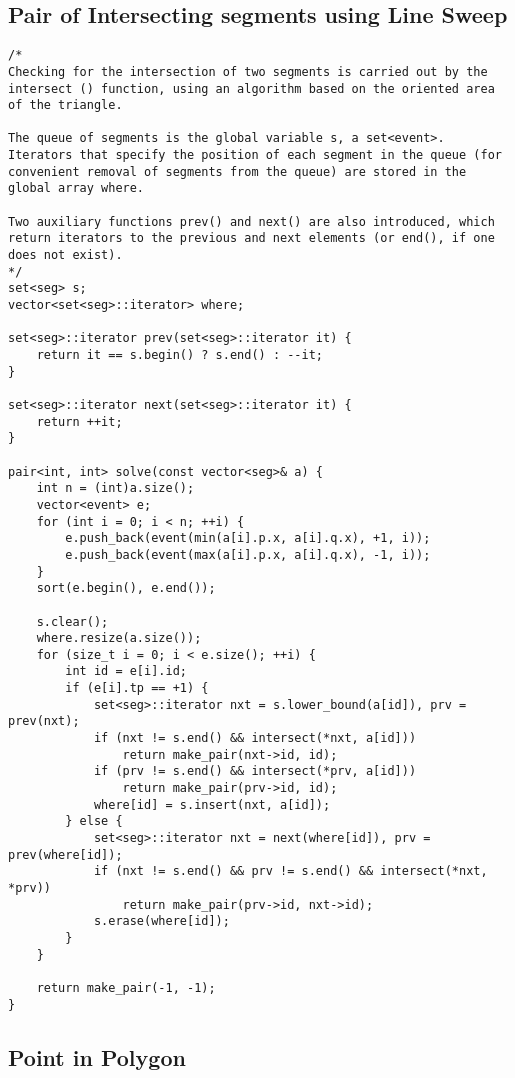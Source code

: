 \documentclass[10pt,a4paper,onesided]{article}
\begin{document}
\begin{multicols*}{3}
\subsection{Pair of Intersecting segments using Line Sweep}
\begin{lstlisting}
/*
Checking for the intersection of two segments is carried out by the intersect () function, using an algorithm based on the oriented area of the triangle.

The queue of segments is the global variable s, a set<event>. Iterators that specify the position of each segment in the queue (for convenient removal of segments from the queue) are stored in the global array where.

Two auxiliary functions prev() and next() are also introduced, which return iterators to the previous and next elements (or end(), if one does not exist).
*/
set<seg> s;
vector<set<seg>::iterator> where;

set<seg>::iterator prev(set<seg>::iterator it) {
    return it == s.begin() ? s.end() : --it;
}

set<seg>::iterator next(set<seg>::iterator it) {
    return ++it;
}

pair<int, int> solve(const vector<seg>& a) {
    int n = (int)a.size();
    vector<event> e;
    for (int i = 0; i < n; ++i) {
        e.push_back(event(min(a[i].p.x, a[i].q.x), +1, i));
        e.push_back(event(max(a[i].p.x, a[i].q.x), -1, i));
    }
    sort(e.begin(), e.end());

    s.clear();
    where.resize(a.size());
    for (size_t i = 0; i < e.size(); ++i) {
        int id = e[i].id;
        if (e[i].tp == +1) {
            set<seg>::iterator nxt = s.lower_bound(a[id]), prv = prev(nxt);
            if (nxt != s.end() && intersect(*nxt, a[id]))
                return make_pair(nxt->id, id);
            if (prv != s.end() && intersect(*prv, a[id]))
                return make_pair(prv->id, id);
            where[id] = s.insert(nxt, a[id]);
        } else {
            set<seg>::iterator nxt = next(where[id]), prv = prev(where[id]);
            if (nxt != s.end() && prv != s.end() && intersect(*nxt, *prv))
                return make_pair(prv->id, nxt->id);
            s.erase(where[id]);
        }
    }

    return make_pair(-1, -1);
}
\end{lstlisting}
\subsection{Point in Polygon}
\begin{lstlisting}


\end{lstlisting}
\end{multicols*}
\end{document}
